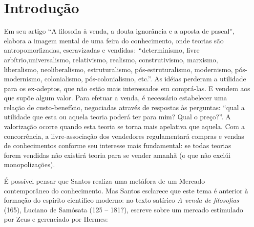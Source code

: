 \chapter*{Introdução} 


Em seu artigo ``A filosofia à venda, a douta ignorância e a aposta de pascal'',  elabora a imagem mental de uma feira do conhecimento, onde teorias  são antropomorfizadas, escravizadas e vendidas:\ ``determinismo, livre arbítrio,universalismo, relativismo, realismo, construtivismo, marxismo, liberalismo, neoliberalismo, estruturalismo, pós-estruturalismo, modernismo, pós-modernismo, colonialismo, pós-colonialismo, etc.''. As idéias perderam a utilidade para os ex-adeptos, que não estão mais interessados em comprá-las. E vendem aos que supõe algum valor. Para efetuar a venda, é necessário estabelecer uma relação de custo-benefício, negociadas através de respostas às perguntas: ``qual a utilidade que esta ou aquela teoria poderá ter para mim? Qual o preço?''. A valorização ocorre quando esta teoria se torna mais apelativa que aquela. Com a concorrência, a livre-associação dos vendedores regulamentará compras e vendas de conhecimentos conforme seu interesse mais fundamental: se todas teorias forem vendidas não existirá teoria para se vender amanhã (o que não exclúi monopolizações). 

É possível pensar que Santos realiza uma  metáfora de um Mercado contemporâneo do conhecimento. Mas Santos esclarece que este tema é anterior à formação do espírito científico moderno: no texto satírico \emph{A venda de filosofias} (165), Luciano de Samósata (125 -- 181?),  escreve sobre um mercado estimulado por Zeus e gerenciado por Hermes:

